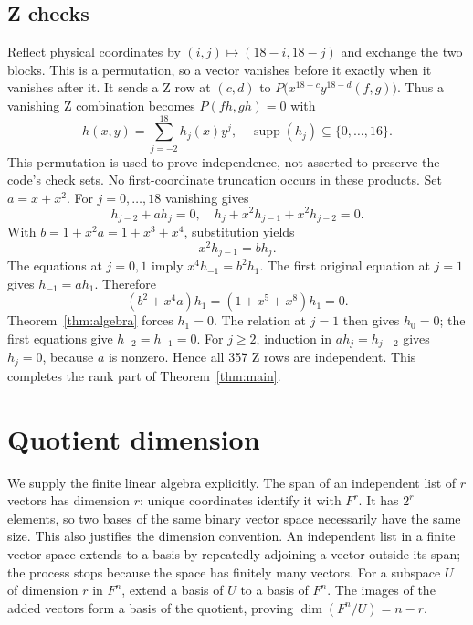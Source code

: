 \documentclass{article}
\DeclareMathOperator{\supp}{supp}
\begin{document}
\subsection{Z checks}\label{sec:z-checks}

Reflect physical coordinates by \((i,j) \mapsto (18 - i, 18 - j)\) and
exchange the two blocks. This is a permutation, so a vector vanishes before it
exactly when it vanishes after it. It sends a Z row at \((c,d)\) to
\(P\bigl(x^{18-c} y^{18-d} (f, g)\bigr)\). Thus a vanishing Z combination
becomes \(P(fh, gh) = 0\) with
\begin{equation}
  h(x,y) = \sum_{j=-2}^{18} h_j(x) y^j, \quad
  \supp(h_j) \subseteq \{0, \dots, 16\}.
\end{equation}
This permutation is used to prove independence, not asserted to preserve the
code's check sets. No first-coordinate truncation occurs in these products.
Set \(a = x + x^2\). For \(j = 0, \dots, 18\) vanishing gives
\begin{equation}
  h_{j-2} + a h_j = 0, \quad h_j + x^2 h_{j-1} + x^2 h_{j-2} = 0.
\end{equation}
With \(b = 1 + x^2 a = 1 + x^3 + x^4\), substitution yields
\begin{equation}
  x^2 h_{j-1} = b h_j.
\end{equation}
The equations at \(j = 0, 1\) imply \(x^4 h_{-1} = b^2 h_1\). The first
original equation at \(j = 1\) gives \(h_{-1} = a h_1\). Therefore
\begin{equation}
  (b^2 + x^4 a) h_1 = (1 + x^5 + x^8) h_1 = 0.
\end{equation}
Theorem~\ref{thm:algebra} forces \(h_1 = 0\). The relation at \(j = 1\) then
gives \(h_0 = 0\); the first equations give \(h_{-2} = h_{-1} = 0\). For
\(j \ge 2\), induction in \(a h_j = h_{j-2}\) gives \(h_j = 0\), because \(a\)
is nonzero. Hence all 357 Z rows are independent. This completes the rank part
of Theorem~\ref{thm:main}.

\section{Quotient dimension}\label{sec:quotient}

We supply the finite linear algebra explicitly. The span of an independent
list of \(r\) vectors has dimension \(r\): unique coordinates identify it with
\(F^r\). It has \(2^r\) elements, so two bases of the same binary vector space
necessarily have the same size. This also justifies the dimension convention.
An independent list in a finite vector space extends to a basis by repeatedly
adjoining a vector outside its span; the process stops because the space has
finitely many vectors. For a subspace \(U\) of dimension \(r\) in \(F^n\),
extend a basis of \(U\) to a basis of \(F^n\). The images of the added vectors
form a basis of the quotient, proving \(\dim(F^n/U) = n - r\).
\end{document}
